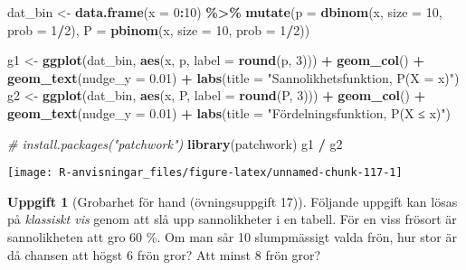 \documentclass[
]{book}
\newenvironment{Shaded}{\begin{snugshade}}{\end{snugshade}}
\newcommand{\AttributeTok}[1]{\textcolor[rgb]{0.13,0.29,0.53}{#1}}
\newcommand{\CommentTok}[1]{\textcolor[rgb]{0.56,0.35,0.01}{\textit{#1}}}
\newcommand{\DecValTok}[1]{\textcolor[rgb]{0.00,0.00,0.81}{#1}}
\newcommand{\FloatTok}[1]{\textcolor[rgb]{0.00,0.00,0.81}{#1}}
\newcommand{\FunctionTok}[1]{\textcolor[rgb]{0.13,0.29,0.53}{\textbf{#1}}}
\newcommand{\NormalTok}[1]{#1}
\newcommand{\OtherTok}[1]{\textcolor[rgb]{0.56,0.35,0.01}{#1}}
\newcommand{\SpecialCharTok}[1]{\textcolor[rgb]{0.81,0.36,0.00}{\textbf{#1}}}
\newcommand{\StringTok}[1]{\textcolor[rgb]{0.31,0.60,0.02}{#1}}
\theoremstyle{definition}
\theoremstyle{definition}
\theoremstyle{definition}
\newtheorem{exercise}{Uppgift}[chapter]
\theoremstyle{definition}
\theoremstyle{remark}
\begin{document}
\begin{Shaded}
\begin{Highlighting}[]
\NormalTok{dat\_bin }\OtherTok{\textless{}{-}} \FunctionTok{data.frame}\NormalTok{(}\AttributeTok{x =} \DecValTok{0}\SpecialCharTok{:}\DecValTok{10}\NormalTok{) }\SpecialCharTok{\%\textgreater{}\%} 
  \FunctionTok{mutate}\NormalTok{(}\AttributeTok{p =} \FunctionTok{dbinom}\NormalTok{(x, }\AttributeTok{size =} \DecValTok{10}\NormalTok{, }\AttributeTok{prob =} \DecValTok{1}\SpecialCharTok{/}\DecValTok{2}\NormalTok{),}
         \AttributeTok{P =} \FunctionTok{pbinom}\NormalTok{(x, }\AttributeTok{size =} \DecValTok{10}\NormalTok{, }\AttributeTok{prob =} \DecValTok{1}\SpecialCharTok{/}\DecValTok{2}\NormalTok{))}

\NormalTok{g1 }\OtherTok{\textless{}{-}} \FunctionTok{ggplot}\NormalTok{(dat\_bin, }\FunctionTok{aes}\NormalTok{(x, p, }\AttributeTok{label =} \FunctionTok{round}\NormalTok{(p, }\DecValTok{3}\NormalTok{))) }\SpecialCharTok{+} 
  \FunctionTok{geom\_col}\NormalTok{() }\SpecialCharTok{+} 
  \FunctionTok{geom\_text}\NormalTok{(}\AttributeTok{nudge\_y =} \FloatTok{0.01}\NormalTok{) }\SpecialCharTok{+}
  \FunctionTok{labs}\NormalTok{(}\AttributeTok{title =} \StringTok{"Sannolikhetsfunktion, P(X = x)"}\NormalTok{)}
\NormalTok{g2 }\OtherTok{\textless{}{-}} \FunctionTok{ggplot}\NormalTok{(dat\_bin, }\FunctionTok{aes}\NormalTok{(x, P, }\AttributeTok{label =} \FunctionTok{round}\NormalTok{(P, }\DecValTok{3}\NormalTok{))) }\SpecialCharTok{+} 
  \FunctionTok{geom\_col}\NormalTok{() }\SpecialCharTok{+} 
  \FunctionTok{geom\_text}\NormalTok{(}\AttributeTok{nudge\_y =} \FloatTok{0.01}\NormalTok{) }\SpecialCharTok{+}
  \FunctionTok{labs}\NormalTok{(}\AttributeTok{title =} \StringTok{"Fördelningsfunktion, P(X ≤ x)"}\NormalTok{)}

\CommentTok{\# install.packages("patchwork")}
\FunctionTok{library}\NormalTok{(patchwork)}
\NormalTok{g1 }\SpecialCharTok{/}\NormalTok{ g2}
\end{Highlighting}
\end{Shaded}

\begin{center}\texttt{[image: R-anvisningar\_files/figure-latex/unnamed-chunk-117-1]} \end{center}

\begin{exercise}[Grobarhet för hand (övningsuppgift 17)]
Följande uppgift kan lösas på \emph{klassiskt vis} genom att slå upp sannolikheter i en tabell. För en viss frösort är sannolikheten att gro 60 \%. Om man sår 10 slumpmässigt valda frön, hur stor är då chansen att högst 6 frön gror? Att minst 8 frön gror?
\end{exercise}
\end{document}
